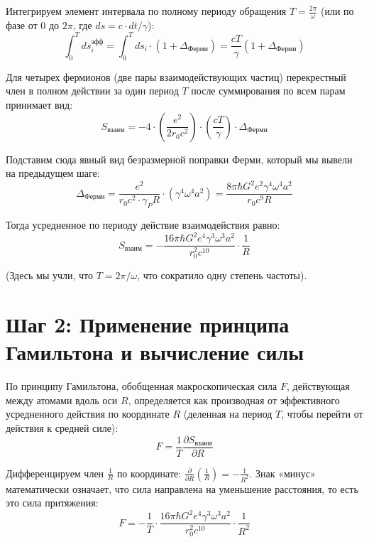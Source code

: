 \documentclass[12pt,a4paper]{article}
\begin{document}
Интегрируем элемент интервала по полному периоду обращения $T = \frac{2\pi}{\omega}$ (или по фазе от $0$ до $2\pi$, где $ds = c \cdot dt / \gamma$):
\begin{equation}
\int_0^T ds_i^{эфф} = \int_0^T ds_i \cdot (1 + \Delta_{Ферми}) = \frac{c T}{\gamma} \left( 1 + \Delta_{Ферми} \right)
\end{equation}

Для четырех фермионов (две пары взаимодействующих частиц) перекрестный член в полном действии за один период $T$ после суммирования по всем парам принимает вид:
\begin{equation}
S_{взаим} = - 4 \cdot \left( \frac{e^2}{2r_0 c^2} \right) \cdot \left( \frac{c T}{\gamma} \right) \cdot \Delta_{Ферми}
\end{equation}

Подставим сюда явный вид безразмерной поправки Ферми, который мы вывели на предыдущем шаге:
\begin{equation}
\Delta_{Ферми} = \frac{e^2}{r_0 c^2 \cdot \gamma_P R} \cdot (\gamma^4 \omega^4 a^2) = \frac{8\pi \hbar G^2 e^2 \gamma^4 \omega^4 a^2}{r_0 c^9 R}
\end{equation}

Тогда усредненное по периоду действие взаимодействия равно:
\begin{equation}
S_{взаим} = - \frac{16\pi \hbar G^2 e^4 \gamma^3 \omega^3 a^2}{r_0^2 c^{10}} \cdot \frac{1}{R}
\end{equation}

(Здесь мы учли, что $T = 2\pi/\omega$, что сократило одну степень частоты).

\section*{Шаг 2: Применение принципа Гамильтона и вычисление силы}

По принципу Гамильтона, обобщенная макроскопическая сила $F$, действующая между атомами вдоль оси $R$, определяется как производная от эффективного усредненного действия по координате $R$ (деленная на период $T$, чтобы перейти от действия к средней силе):
\begin{equation}
F = \frac{1}{T} \frac{\partial S_{взаим}}{\partial R}
\end{equation}

Дифференцируем член $\frac{1}{R}$ по координате: $\frac{\partial}{\partial R}\left(\frac{1}{R}\right) = -\frac{1}{R^2}$. Знак «минус» математически означает, что сила направлена на уменьшение расстояния, то есть это сила притяжения:
\begin{equation}
F = - \frac{1}{T} \cdot \frac{16\pi \hbar G^2 e^4 \gamma^3 \omega^3 a^2}{r_0^2 c^{10}} \cdot \frac{1}{R^2}
\end{equation}
\end{document}
